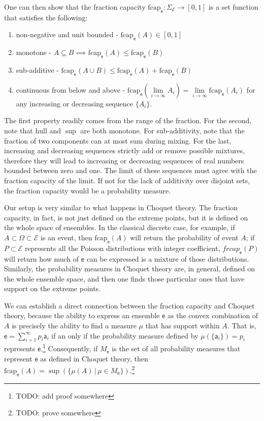 \documentclass[10pt,twocolumn, nofootinbib]{revtex4-2}
\newcommand\hull{\mathrm{hull}}
\newcommand\frcap{\mathrm{fcap}}
\newcommand{\ens}[1][e] {\mathsf{#1}} %
\newcommand{\Ens}[1][E] {\mathcal{#1}} %
\begin{document}
One can then show that the fraction capacity $\frcap_{\ens} : \Sigma_{\Ens} \to [0,1]$ is a set function that satisfies the following:
\begin{enumerate}
	\item non-negative and unit bounded - $\frcap_{\ens}(A) \in [0,1]$
	\item monotone - $A \subseteq B \implies \frcap_{\ens}(A) \leq \frcap_{\ens}(B)$
	\item sub-additive - $\frcap_{\ens}(A \cup B) \leq \frcap_{\ens}(A) + \frcap_{\ens}(B)$
	\item continuous from below and above - $\frcap_{\ens}(\lim\limits_{i \to \infty} A_i) = \lim\limits_{i \to \infty} \frcap_{\ens}(A_i)$ for any increasing or decreasing sequence $\{A_i\}$.
\end{enumerate}

The first property readily comes from the range of the fraction. For the second, note that $\hull$ and $\sup$ are both monotone. For sub-additivity, note that the fraction of two components can at most sum during mixing. For the last, increasing and decreasing sequences strictly add or remove possible mixtures, therefore they will lead to increasing or decreasing sequences of real numbers bounded between zero and one. The limit of these sequences must agree with the fraction capacity of the limit. If not for the lack of additivity over disjoint sets, the fraction capacity would be a probability measure.

Our setup is very similar to what happens in Choquet theory. The fraction capacity, in fact, is not just defined on the extreme points, but it is defined on the whole space of ensembles. In the classical discrete case, for example, if $A \subset \Omega \subset \Ens$ is an event, then $\frcap_{\ens}(A)$ will return the probability of event $A$; if $P \subset \Ens$ represents all the Poisson distributions with integer coefficient, $frcap_{\ens}(P)$ will return how much of $\ens$ can be expressed is a mixture of those distributions. Similarly, the probability measures in Choquet theory are, in general, defined on the whole ensemble space, and then one finds those particular ones that have support on the extreme points.

We can establish a direct connection between the fraction capacity and Choquet theory, because the ability to express an ensemble $\ens$ as the convex combination of $A$ is precisely the ability to find a measure $\mu$ that has support within $A$. That is, $\ens = \sum_{i=1}^{\infty} p_i \ens[a]_i$ if an only if the probability measure defined by $\mu(\{\ens[a]_i\}) = p_i$ represents $\ens$.\footnote{TODO: add proof somewhere} Consequently, if $M_{\ens}$ is the set of all probability measures that represent $\ens$ as defined in Choquet theory, then $\frcap_{\ens}(A) = \sup(\{\mu(A) \, | \, \mu \in M_{\ens}\})$.\footnote{TODO: prove somewhere}
\end{document}
